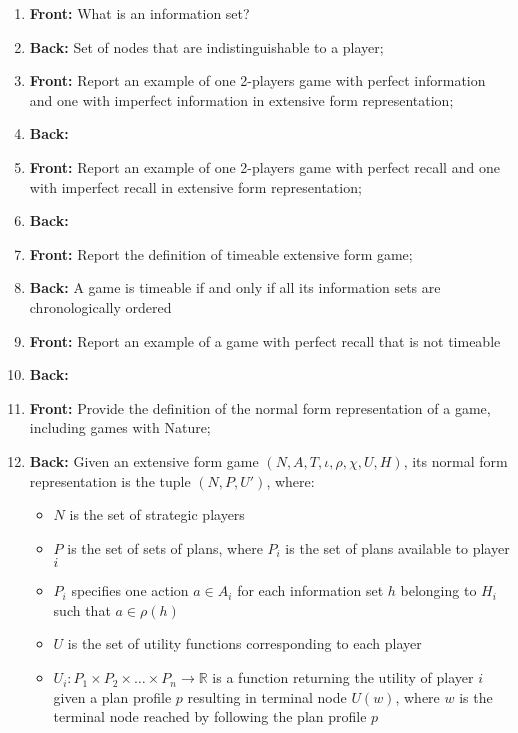 \documentclass{article}
\begin{document}
\begin{enumerate}
    \newpage\item \textbf{Front:} What is an information set?
    \newpage\item \textbf{Back:} Set of nodes that are indistinguishable to a player;
    
    \newpage\item \textbf{Front:} Report an example of one 2-players game with perfect information and one with imperfect information in extensive form representation;
    \newpage\item \textbf{Back:}
    
    \newpage\item \textbf{Front:} Report an example of one 2-players game with perfect recall and one with imperfect recall in extensive form representation;
    \newpage\item \textbf{Back:}
    
    \newpage\item \textbf{Front:} Report the definition of timeable extensive form game;
    \newpage\item \textbf{Back:} A game is timeable if and only if all its information sets are chronologically ordered
    
    \newpage\item \textbf{Front:} Report an example of a game with perfect recall that is not timeable
    \newpage\item \textbf{Back:}
    
    \newpage\item \textbf{Front:} Provide the definition of the normal form representation of a game, including games with Nature;
    \newpage\item \textbf{Back:} Given an extensive form game $(N, A, T, \iota, \rho, \chi, U, H)$, its normal form representation is the tuple $(N, P, U')$, where:
    \begin{itemize}
        \item $N$ is the set of strategic players
        \item $P$ is the set of sets of plans, where $P_i$ is the set of plans available to player $i$
        \item $P_i$ specifies one action $a \in A_i$ for each information set $h$ belonging to $H_i$ such that $a \in \rho(h)$
        \item $U$ is the set of utility functions corresponding to each player
        \item $U_i: P_1 \times P_2 \times \ldots \times P_n \rightarrow \mathbb{R}$ is a function returning the utility of player $i$ given a plan profile $p$ resulting in terminal node $U(w)$, where $w$ is the terminal node reached by following the plan profile $p$
    \end{itemize}
    

\end{enumerate}
\end{document}
